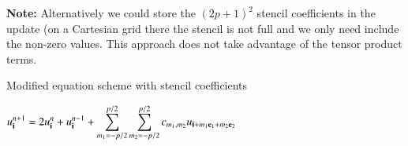 \begin{algorithm}[H]
\begin{algorithmic}[1]

% 
\end{algorithmic} 
\label{alg:HTP2dOrder6Cartesian}
\end{algorithm}

\mni
\textbf{Note:} Alternatively we could store the $(2p+1)^2$  stencil coefficients in the update (on a Cartesian grid
there the stencil is not full and we only need include the non-zero values.
This approach does not take advantage of the tensor product terms.
\begin{algorithm}[H]
\algFontSize 
\caption{Modified equation scheme with stencil coefficients}
\begin{algorithmic}[1]
    \For{ $\iv$ } 
       \State $\displaystyle u^{n+1}_{\mathbf{ i}} = 2 u^n_{\mathbf{ i}} + u^{n-1}_{\mathbf{ i}} + \sum_{m_1=-p/2}^{p/2} \sum_{m_2=-p/2}^{p/2}  c_{m_1,m_2} u_{\mathbf{ i}+m_1\mathbf{ e}_1+m_2\mathbf{ e}_2}  $
    \EndFor   
\end{algorithmic} 
\label{alg:ModifiedEquationWithStencilCoefficients}
\end{algorithm}


